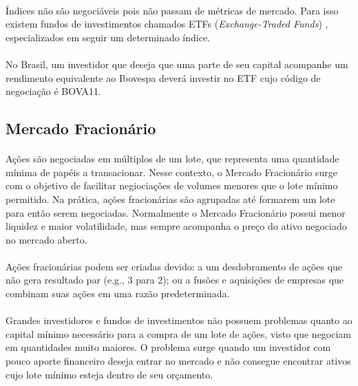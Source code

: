 \paragraph{} Índices não são negociáveis pois não passam de métricas de mercado. Para isso existem fundos de investimentos chamados ETFs (\textit{Exchange-Traded Funds}) \cite{etf}, especializados em seguir um determinado índice.

\paragraph{} No Brasil, um investidor que deseja que uma parte de seu capital acompanhe um rendimento equivalente ao Ibovespa deverá investir no ETF cujo código de negociação é BOVA11.



\subsection{Mercado Fracionário}

\paragraph{} Ações são negociadas em múltiplos de um lote, que representa uma quantidade mínima de papéis a transacionar. Nesse contexto, o Mercado Fracionário \cite{mercado_fracionario} surge com o objetivo de facilitar negiociações de volumes menores que o lote mínimo permitido. Na prática, ações fracionárias são agrupadas até formarem um lote para então serem negociadas. Normalmente o Mercado Fracionário possui menor liquidez e maior volatilidade, mas sempre acompanha o preço do ativo negociado no mercado aberto.

\paragraph{} Ações fracionárias podem ser criadas devido: a um desdobramento de ações que não gera resultado par (e.g., 3 para 2); ou a fusões e aquisições de empresas que combinam suas ações em uma razão predeterminada.

\paragraph{} Grandes investidores e fundos de investimentos não possuem problemas quanto ao capital mínimo necessário para a compra de um lote de ações, visto que negociam em quantidades muito maiores. O problema surge quando um investidor com pouco aporte financeiro deseja entrar no mercado e não consegue encontrar ativos cujo lote mínimo esteja dentro de seu orçamento.

